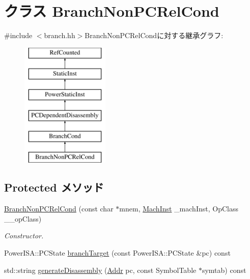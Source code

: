 \hypertarget{classPowerISA_1_1BranchNonPCRelCond}{
\section{クラス BranchNonPCRelCond}
\label{classPowerISA_1_1BranchNonPCRelCond}
}


{\ttfamily \#include $<$branch.hh$>$}BranchNonPCRelCondに対する継承グラフ:\begin{figure}[H]
\begin{center}
\leavevmode
\includegraphics[height=6cm]{classPowerISA_1_1BranchNonPCRelCond}
\end{center}
\end{figure}
\subsection*{Protected メソッド}
\begin{DoxyCompactItemize}
\item 
\hyperlink{classPowerISA_1_1BranchNonPCRelCond_af2cfe55ddfaf984cdee6e0ac3db83f53}{BranchNonPCRelCond} (const char $\ast$mnem, \hyperlink{namespacePowerISA_a301c22ea09fa33dcfe6ddf22f203699c}{MachInst} \_\-machInst, OpClass \_\-\_\-opClass)
\begin{DoxyCompactList}\small\item\em Constructor. \item\end{DoxyCompactList}\item 
PowerISA::PCState \hyperlink{classPowerISA_1_1BranchNonPCRelCond_a860401b0a6432ac5dbe246c64448d56d}{branchTarget} (const PowerISA::PCState \&pc) const 
\item 
std::string \hyperlink{classPowerISA_1_1BranchNonPCRelCond_a95d323a22a5f07e14d6b4c9385a91896}{generateDisassembly} (\hyperlink{base_2types_8hh_af1bb03d6a4ee096394a6749f0a169232}{Addr} pc, const SymbolTable $\ast$symtab) const 
\end{DoxyCompactItemize}

